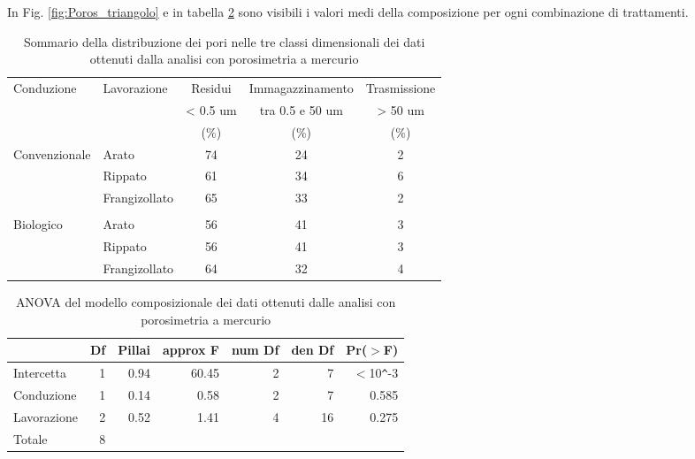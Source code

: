 \documentclass[a4paper]{article}
\begin{document}
\vspace*{3em}

In Fig. \ref{fig:Poros_triangolo} e in tabella
\ref{tab:poros_anova} sono visibili i valori medi della composizione
per ogni combinazione di trattamenti.

\begin{table}[hb]
\centering
\caption{Sommario della distribuzione dei pori nelle tre classi
  dimensionali dei dati ottenuti dalla analisi con porosimetria a
  mercurio}
\label{tab:Poro_medie}
\begin{tabular}{llccc}
  \hline
  Conduzione & Lavorazione & Residui   & Immagazzinamento & Trasmissione \\
             &             &  < 0.5 um &  tra 0.5 e 50 um & > 50 um      \\
             &             &     (\%)  &            (\%)  &  (\%) \\
  \hline
  Convenzionale & Arato & 74 & 24 & 2 \\
  & Rippato & 61 & 34 & 6 \\
  & Frangizollato & 65 & 33 & 2 \\
\\
  Biologico & Arato & 56 & 41 & 3 \\
  & Rippato & 56 & 41 & 3 \\
  & Frangizollato & 64 & 32 & 4 \\
  \hline
\end{tabular}
\end{table}%

\begin{table}[ht]
\centering
\caption{ANOVA del modello composizionale dei dati ottenuti dalle
  analisi con porosimetria a mercurio }
\label{tab:poros_anova}
\begin{tabular}{lrrrrrr}
  \hline
 & Df & Pillai & approx F & num Df & den Df & Pr($>$F) \\ 
  \hline
Intercetta & 1 & 0.94 & 60.45 & 2 & 7 & $<$10\verb|^|-3 \\ 
  Conduzione & 1 & 0.14 & 0.58 & 2 & 7 & 0.585 \\ 
  Lavorazione & 2 & 0.52 & 1.41 & 4 & 16 & 0.275 \\ 
  Totale & 8 &  &  &  &  &  \\ 
   \hline
\end{tabular}
\end{table}
\end{document}
